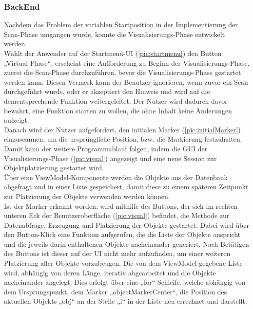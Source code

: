 \subsubsection{BackEnd}
Nachdem das Problem der variablen Startposition in der Implementierung der Scan-Phase umgangen wurde, konnte die Visualisierungs-Phase entwickelt werden. 
\\ 
\linebreak
Wählt der Anwender auf der Startmenü-\acs{UI} (\ref{pic:startmenu}) den Button „Virtual-Phase“, erscheint eine Aufforderung zu Beginn der Visualisierungs-Phase, 
zuerst die Scan-Phase durchzuführen, bevor die Visualisierungs-Phase gestartet werden kann. Diesen Vermerk kann der 
Benutzer ignorieren, wenn zuvor ein Scan durchgeführt wurde, oder er akzeptiert den Hinweis und wird auf die dementsprechende Funktion weitergeleitet. 
Der Nutzer wird dadurch davor bewahrt, eine Funktion starten zu wollen, die ohne Inhalt keine Änderungen aufzeigt.
\\ 
Danach wird der Nutzer aufgefordert, den initialen Marker (\ref{pic:initialMarker}) einzuscannen, um die ursprüngliche Position, bzw. die Markierung festzuhalten. 
Damit kann der weitere Programmablauf folgen, indem die \acs{GUI} der Visualisierungs-Phase (\ref{pic:visual}) angezeigt und eine neue Session zur 
Objektplatzierung gestartet wird. 
\\
Über eine ViewModel-Komponente werden die Objekte aus der Datenbank abgefragt und in einer Liste gespeichert, damit diese zu einem späteren Zeitpunkt zur 
Platzierung der Objekte verwenden werden können.
\\
Ist der Marker erkannt worden, wird mithilfe des Buttons, der sich im rechten unteren Eck der Benutzeroberfläche (\ref{pic:visual}) befindet, die Methode zur 
Datenabfrage, Erzeugung und Platzierung der Objekte gestartet. Dabei wird über den Button-Klick eine Funktion aufgerufen, die die Liste der Objekte anspricht und 
die jeweils darin enthaltenen Objekte nacheinander generiert. Nach Betätigen des Buttons ist dieser auf der \acs{UI} nicht mehr aufzufinden, um einer weiteren 
Platzierung aller Objekte vorzubeugen. Die von dem ViewModel gegebene Liste wird, abhängig von deren Länge, iterativ abgearbeitet und die Objekte 
nacheinander angelegt. Dies erfolgt über eine „for“-Schleife, welche abhängig von dem Ursprungspunkt, dem Marker „objectMarkerCenter“, die Position des 
aktuellen Objekts „obj“ an der Stelle „i“ in der Liste neu errechnet und darstellt.
\\ 
